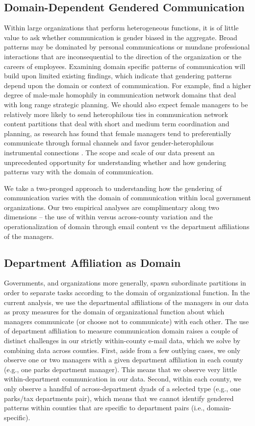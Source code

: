 \documentclass{pnastwo}
\begin{document}
\begin{article}
\section{Domain-Dependent Gendered Communication}
Within large organizations that perform heterogeneous functions, it is of little value to ask whether communication is gender biased in the aggregate. Broad patterns may be dominated by personal communications or mundane professional interactions that are inconsequential to the direction of the organization or the careers of employees. Examining domain specific patterns of communication will build upon limited existing findings, which indicate that gendering patterns depend upon the domain or context of communication. For example, \citet{Brass1985} find a higher degree of male-male homophily in communication network domains that deal with long range strategic planning. We should also expect female managers to be relatively more likely to send heterophilous ties in communication network content partitions that deal with short and medium term coordination and planning, as research has found that female managers tend to preferentially communicate through formal channels  \citep{Ragins1989} and favor gender-heterophilous instrumental connections \citep{Ibarra1992}. The scope and scale of our data present an unprecedented opportunity for understanding whether and how gendering patterns vary with the domain of communication.

We take a two-pronged approach to understanding how the gendering of communication varies with the domain of communication within local government organizations. Our two empirical analyses are complimentary along two dimensions -- the use of within versus across-county variation and the operationalization of domain through email content vs the department affiliations of the managers. 

\subsection{Department Affiliation as Domain}

Governments, and organizations more generally, spawn subordinate partitions in order to separate tasks according to the domain of organizational function. In the current analysis, we use the departmental affiliations of the managers in our data as proxy measures for the domain of organizational function about which managers communicate (or choose not to communicate) with each other. The use of department affiliation to measure communication domain raises a couple of distinct challenges in our strictly within-county e-mail data, which we solve by combining data across counties. First, aside from a few outlying cases, we only observe one or two managers with a given department affiliation in each county (e.g., one parks department manager). This means that we observe very little within-department communication in our data. Second, within each county, we only observe a handful of across-department dyads of a selected type (e.g., one parks/tax departments pair), which means that we cannot identify gendered patterns within counties that are specific to department pairs (i.e., domain-specific).


\end{article}
\end{document}
